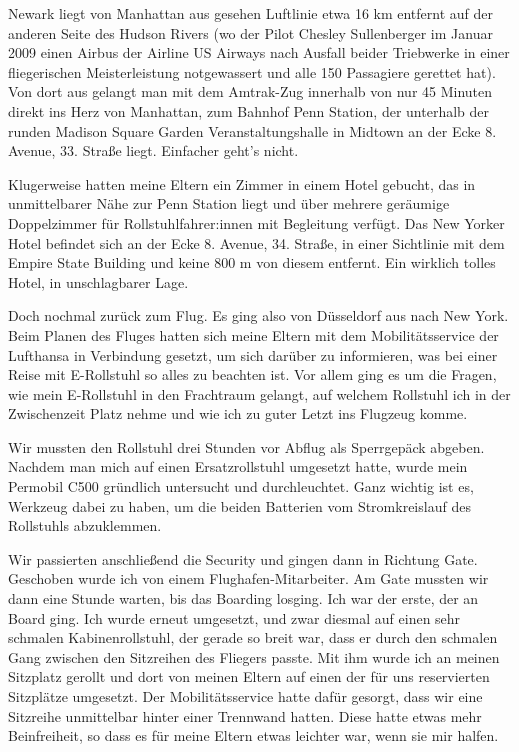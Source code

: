 \documentclass[fontsize=14pt,a4paper,headinclude,DIV=calc,automark]{scrbook}
\begin{document}
Newark liegt von Manhattan aus gesehen Luftlinie etwa 16 km entfernt auf der anderen Seite des Hudson Rivers (wo der Pilot Chesley Sullenberger im Januar 2009 einen Airbus der Airline US Airways nach Ausfall beider Triebwerke in einer fliegerischen Meisterleistung notgewassert und alle 150 Passagiere gerettet hat). Von dort aus gelangt man mit dem Amtrak-Zug innerhalb von nur 45 Minuten direkt ins Herz von Manhattan, zum Bahnhof Penn Station, der unterhalb der runden Madison Square Garden Veranstaltungshalle in Midtown an der Ecke 8. Avenue, 33. Straße liegt. Einfacher geht’s nicht.

Klugerweise hatten meine Eltern ein Zimmer in einem Hotel gebucht, das in unmittelbarer Nähe zur Penn Station liegt und über mehrere geräumige Doppelzimmer für Rollstuhlfahrer:innen mit Begleitung verfügt. Das New Yorker Hotel befindet sich an der Ecke 8. Avenue, 34. Straße, in einer Sichtlinie mit dem Empire State Building und keine 800 m von diesem entfernt. Ein wirklich tolles Hotel, in unschlagbarer Lage.

Doch nochmal zurück zum Flug. Es ging also von Düsseldorf aus nach New York. Beim Planen des Fluges hatten sich meine Eltern mit dem Mobilitätsservice der Lufthansa in Verbindung gesetzt, um sich darüber zu informieren, was bei einer Reise mit E-Rollstuhl so alles zu beachten ist. Vor allem ging es um die Fragen, wie mein E-Rollstuhl in den Frachtraum gelangt, auf welchem Rollstuhl ich in der Zwischenzeit Platz nehme und wie ich zu guter Letzt ins Flugzeug komme.

Wir mussten den Rollstuhl drei Stunden vor Abflug als Sperrgepäck abgeben. Nachdem man mich auf einen Ersatzrollstuhl umgesetzt hatte, wurde mein Permobil C500 gründlich untersucht und durchleuchtet. Ganz wichtig ist es, Werkzeug dabei zu haben, um die beiden Batterien vom Stromkreislauf des Rollstuhls abzuklemmen.

Wir passierten anschließend die Security und gingen dann in Richtung Gate. Geschoben wurde ich von einem Flughafen-Mitarbeiter. Am Gate mussten wir dann eine Stunde warten, bis das Boarding losging. Ich war der erste, der an Board ging. Ich wurde erneut umgesetzt, und zwar diesmal auf einen sehr schmalen Kabinenrollstuhl, der gerade so breit war, dass er durch den schmalen Gang zwischen den Sitzreihen des Fliegers passte. Mit ihm wurde ich an meinen Sitzplatz gerollt und dort von meinen Eltern auf einen der für uns reservierten Sitzplätze umgesetzt. Der Mobilitätsservice hatte dafür gesorgt, dass wir eine Sitzreihe unmittelbar hinter einer Trennwand hatten. Diese hatte etwas mehr Beinfreiheit, so dass es für meine Eltern etwas leichter war, wenn sie mir halfen.
\end{document}
